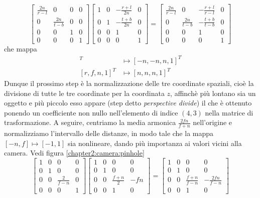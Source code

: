 \begin{equation}\label{chapter2:camera:fromFrustum2nbynquad}
	\begin{bmatrix}
		\frac{2n}{r-l} & 0 & 0 & 0 \\ 0 & \frac{2n}{t-b} & 0 & 0 \\ 0 & 0 & 1 & 0 \\ 0 & 0 & 0 & 1
	\end{bmatrix}
	\begin{bmatrix}
		1 & 0 & -\frac{r+l}{2n} & 0 \\ 0 & 1 & -\frac{t+b}{2n} & 0 \\ 0 & 0 & 1 & 0 \\ 0 & 0 & 0 & 1
	\end{bmatrix}
	=
	\begin{bmatrix}
		\frac{2n}{r-l} & 0 & -\frac{r+l}{r-l} & 0 \\ 0 & \frac{2n}{t-b} & -\frac{t+b}{t-b} & 0 \\ 0 & 0 & 1 & 0 \\ 0 & 0 & 0 & 1
	\end{bmatrix}
\end{equation}
che mappa 
\begin{align*}
	[l, b, n, 1]^T &\mapsto [-n,-n, n, 1]^T \\
	[r, f, n, 1]^T &\mapsto [n, n, n, 1]^T
\end{align*}
Dunque il prossimo step \`e la normalizzazione delle tre coordinate spaziali, cio\`e la divisione di tutte le tre coordinate per la coordinata $z$,
affinch\`e pi\`u lontano sia un oggetto e pi\`u piccolo esso appare (step detto \textit{perspective divide}) il che \`e ottenuto ponendo un 
coefficiente non nullo nell'elemento di indice $(4,3)$ nella matrice di trasformazione. A seguire, centriamo la media armonica $\frac{2fn}{f+n}$
nell'origine e normalizziamo l'intervallo delle distanze, in modo tale che la mappa $[-n,f] \mapsto [-1,1]$ sia nonlineare, 
dando pi\`u importanza ai valori vicini alla camera. Vedi figura \ref{chapter2:camera:pinhole} 
\begin{equation}\label{chapter2:camera:remapDepthNonlinear}
	\begin{bmatrix}
		1 & 0 & 0 & 0 \\ 0 & 1 & 0 & 0 \\ 0 & 0 & \frac{2}{f-n} & 0 \\ 0 & 0 & 0 & 1
	\end{bmatrix}
	\begin{bmatrix}
		1 & 0 & 0 & 0 \\ 0 & 1 & 0 & 0 \\ 0 & 0 & \frac{f+n}{2} & -fn \\ 0 & 0 & 1 & 0
	\end{bmatrix}
	=
	\begin{bmatrix}
		1 & 0 & 0 & 0 \\ 0 & 1 & 0 & 0 \\ 0 & 0 & \frac{f+n}{f-n} & -\frac{2fn}{f-n} \\ 0 & 0 & 1 & 0
	\end{bmatrix}
\end{equation}
